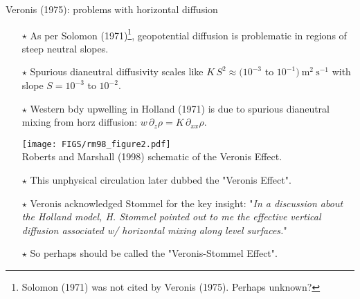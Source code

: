 \documentclass{beamer}
\begin{document}
\begin{frame}{Veronis (1975): problems with horizontal diffusion}


\begin{itemize}
    \item[$\star$] As per Solomon (1971)\footnote{Solomon (1971) was not cited by Veronis (1975). Perhaps unknown?}, geopotential diffusion is problematic in regions of steep neutral slopes. 
     \item[$\star$] Spurious dianeutral diffusivity scales like $K \, S^{2} \approx (10^{-3}$ to $10^{-1})~\mbox{m}^{2}~\mbox{s}^{-1}$ with slope $S =10^{-3}$ to $10^{-2}$.  
     \item[$\star$] Western bdy upwelling in Holland (1971) is due to spurious dianeutral mixing from horz diffusion: $w \, \partial_{z} \rho = K \, \partial_{xx}\rho$.


\begin{center}
\texttt{[image: FIGS/rm98\_figure2.pdf]}
\\
{\scriptsize Roberts and Marshall (1998) schematic of the Veronis Effect.}
\end{center}

  \item[$\star$] This unphysical circulation later dubbed the "Veronis Effect".  
  
  \item[$\star$] Veronis acknowledged Stommel for the key insight: "{\it \scriptsize In a discussion about the Holland model, H. Stommel pointed out to me the effective vertical diffusion associated w/ horizontal mixing along level surfaces.}"

 \item[$\star$]  So perhaps should be called the "Veronis-Stommel Effect". 
    
\end{itemize}


\end{frame}
\end{document}
